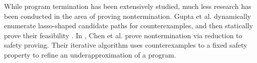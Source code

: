 \documentclass[preprint]{sigplanconf}
\theoremstyle{definition}
\begin{document}




While program termination has been extensively studied, much less research has been conducted in the area of proving nontermination.
Gupta et al. dynamically enumerate lasso-shaped candidate
paths for counterexamples, and then statically prove their feasibility \cite{DBLP:conf/popl/GuptaHMRX08}. 
In \cite{DBLP:conf/tacas/ChenCFNO14}, Chen et al. prove nontermination via
reduction to safety proving. Their iterative algorithm uses counterexamples to a fixed safety property
to refine an underapproximation of a program. 

 


{}
\end{document}
